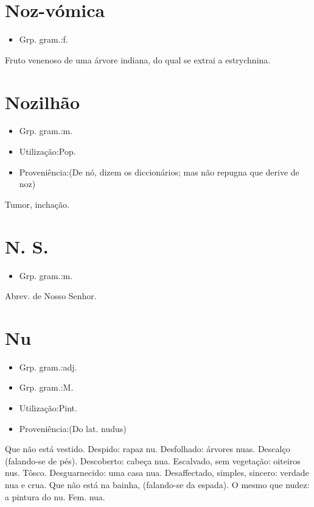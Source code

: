 \section{Noz-vómica}
\begin{itemize}
\item {Grp. gram.:f.}
\end{itemize}
Fruto venenoso de uma árvore indiana, do qual se extrai a estrychnina.
\section{Nozilhão}
\begin{itemize}
\item {Grp. gram.:m.}
\end{itemize}
\begin{itemize}
\item {Utilização:Pop.}
\end{itemize}
\begin{itemize}
\item {Proveniência:(De \textunderscore nó\textunderscore , dizem os diccionários; mas não repugna que derive de \textunderscore noz\textunderscore )}
\end{itemize}
Tumor, inchação.
\section{N. S.}
\begin{itemize}
\item {Grp. gram.:m.}
\end{itemize}
Abrev. de \textunderscore Nosso Senhor\textunderscore .
\section{Nu}
\begin{itemize}
\item {Grp. gram.:adj.}
\end{itemize}
\begin{itemize}
\item {Grp. gram.:M.}
\end{itemize}
\begin{itemize}
\item {Utilização:Pint.}
\end{itemize}
\begin{itemize}
\item {Proveniência:(Do lat. \textunderscore nudus\textunderscore )}
\end{itemize}
Que não está vestido.
Despido: \textunderscore rapaz nu\textunderscore .
Desfolhado: \textunderscore árvores nuas\textunderscore .
Descalço (falando-se de pés).
Descoberto: \textunderscore cabeça nua\textunderscore .
Escalvado, sem vegetação: \textunderscore oiteiros nus\textunderscore .
Tôsco.
Desguarnecido: \textunderscore uma casa nua\textunderscore .
Desaffectado, simples, sincero: \textunderscore verdade nua e crua\textunderscore .
Que não está na bainha, (falando-se da espada).
O mesmo que \textunderscore nudez\textunderscore : \textunderscore a pintura do nu\textunderscore .
Fem. \textunderscore nua\textunderscore .
